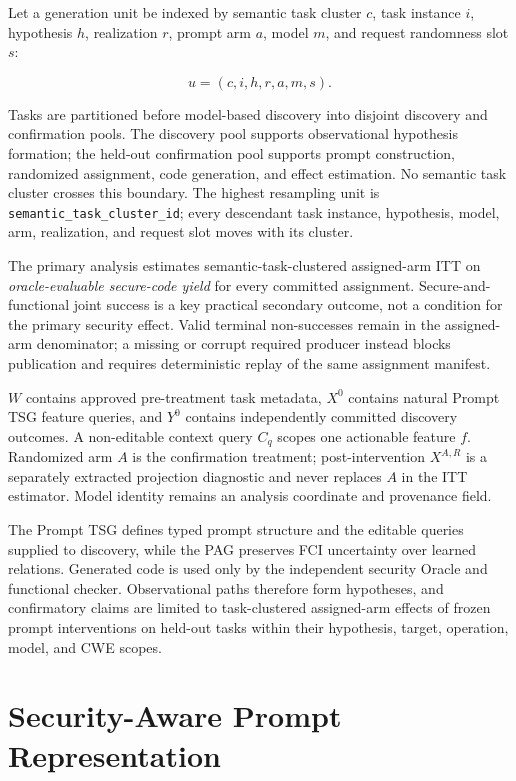 \documentclass[acmsmall,screen,review,anonymous]{acmart}
\newcommand{\prompttsg}{Prompt TSG\xspace}
\begin{document}
Let a generation unit be indexed by semantic task cluster $c$, task instance
$i$, hypothesis $h$, realization $r$, prompt arm $a$, model $m$, and request
randomness slot $s$:

\[
  u = (c,i,h,r,a,m,s).
\]

Tasks are partitioned before model-based discovery into disjoint discovery and
confirmation pools. The discovery pool supports observational hypothesis
formation; the held-out confirmation pool supports prompt construction,
randomized assignment, code generation, and effect estimation. No semantic
task cluster crosses this boundary. The highest resampling unit is
\texttt{semantic\_task\_cluster\_id}; every descendant task instance,
hypothesis, model, arm, realization, and request slot moves with its cluster.

The primary analysis estimates semantic-task-clustered assigned-arm ITT on
\emph{oracle-evaluable secure-code yield} for every committed assignment.
Secure-and-functional joint success is a key practical secondary outcome, not
a condition for the primary security effect. Valid terminal non-successes
remain in the assigned-arm denominator; a missing or corrupt required producer
instead blocks publication and requires deterministic replay of the same
assignment manifest.

$W$ contains approved pre-treatment task metadata, $X^0$ contains natural
Prompt TSG feature queries, and $Y^0$ contains independently committed
discovery outcomes. A non-editable context query $C_q$ scopes one actionable
feature $f$. Randomized arm $A$ is the confirmation treatment;
post-intervention $X^{A,R}$ is a separately extracted projection diagnostic
and never replaces $A$ in the ITT estimator. Model identity remains an analysis
coordinate and provenance field.

The \prompttsg defines typed prompt structure and the editable queries supplied
to discovery, while the PAG preserves FCI uncertainty over learned relations.
Generated code is used only by the independent security Oracle and functional
checker. Observational paths therefore form hypotheses, and confirmatory claims
are limited to task-clustered assigned-arm effects of frozen prompt
interventions on held-out tasks within their hypothesis, target, operation,
model, and CWE scopes.

\section{Security-Aware Prompt Representation}
\end{document}
